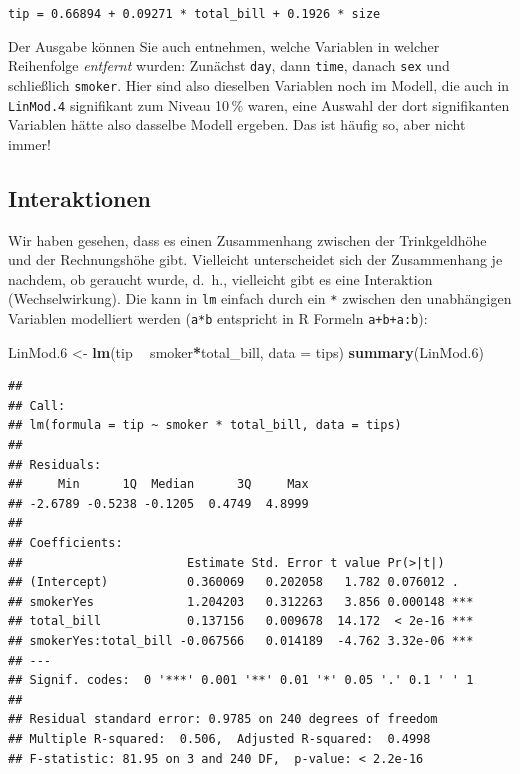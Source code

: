 \documentclass[12pt,ngerman,paper=a4,pagesize,DIV=13]{scrreprt}
\newenvironment{Shaded}{\begin{snugshade}}{\end{snugshade}}
\newcommand{\DataTypeTok}[1]{\textcolor[rgb]{0.13,0.29,0.53}{#1}}
\newcommand{\FloatTok}[1]{\textcolor[rgb]{0.00,0.00,0.81}{#1}}
\newcommand{\KeywordTok}[1]{\textcolor[rgb]{0.13,0.29,0.53}{\textbf{#1}}}
\newcommand{\NormalTok}[1]{#1}
\newcommand{\OperatorTok}[1]{\textcolor[rgb]{0.81,0.36,0.00}{\textbf{#1}}}
\newcommand{\StringTok}[1]{\textcolor[rgb]{0.31,0.60,0.02}{#1}}
\begin{document}
\texttt{tip\ =\ 0.66894\ +\ 0.09271\ *\ total\_bill\ +\ 0.1926\ *\ size}

Der Ausgabe können Sie auch entnehmen, welche Variablen in welcher
Reihenfolge \emph{entfernt} wurden: Zunächst \texttt{day}, dann
\texttt{time}, danach \texttt{sex} und schließlich \texttt{smoker}. Hier
sind also dieselben Variablen noch im Modell, die auch in
\texttt{LinMod.4} signifikant zum Niveau 10\(\,\)\% waren, eine Auswahl
der dort signifikanten Variablen hätte also dasselbe Modell ergeben. Das
ist häufig so, aber nicht immer!

\hypertarget{interaktionen}{%
\subsection{Interaktionen}\label{interaktionen}}

Wir haben gesehen, dass es einen Zusammenhang zwischen der Trinkgeldhöhe
und der Rechnungshöhe gibt. Vielleicht unterscheidet sich der
Zusammenhang je nachdem, ob geraucht wurde, d.~h., vielleicht gibt es
eine Interaktion (Wechselwirkung). Die kann in \texttt{lm} einfach durch
ein \texttt{*} zwischen den unabhängigen Variablen modelliert werden
(\texttt{a*b} entspricht in R Formeln \texttt{a+b+a:b}):

\begin{Shaded}
\begin{Highlighting}[]
\NormalTok{LinMod}\FloatTok{.6}\NormalTok{ <-}\StringTok{ }\KeywordTok{lm}\NormalTok{(tip }\OperatorTok{~}\StringTok{ }\NormalTok{smoker}\OperatorTok{*}\NormalTok{total_bill, }\DataTypeTok{data =}\NormalTok{ tips)}
\KeywordTok{summary}\NormalTok{(LinMod}\FloatTok{.6}\NormalTok{)}
\end{Highlighting}
\end{Shaded}

\begin{verbatim}
## 
## Call:
## lm(formula = tip ~ smoker * total_bill, data = tips)
## 
## Residuals:
##     Min      1Q  Median      3Q     Max 
## -2.6789 -0.5238 -0.1205  0.4749  4.8999 
## 
## Coefficients:
##                       Estimate Std. Error t value Pr(>|t|)    
## (Intercept)           0.360069   0.202058   1.782 0.076012 .  
## smokerYes             1.204203   0.312263   3.856 0.000148 ***
## total_bill            0.137156   0.009678  14.172  < 2e-16 ***
## smokerYes:total_bill -0.067566   0.014189  -4.762 3.32e-06 ***
## ---
## Signif. codes:  0 '***' 0.001 '**' 0.01 '*' 0.05 '.' 0.1 ' ' 1
## 
## Residual standard error: 0.9785 on 240 degrees of freedom
## Multiple R-squared:  0.506,  Adjusted R-squared:  0.4998 
## F-statistic: 81.95 on 3 and 240 DF,  p-value: < 2.2e-16
\end{verbatim}
\end{document}
